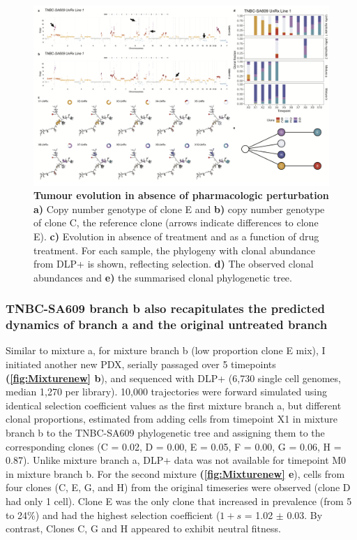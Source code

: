 \begin{figure}
\centering
\includegraphics[width=\textwidth]{Figures/chap4/genePlotsa609mix.png}
	
\caption[Tumour evolution in absence of pharmacologic perturbation]
	{\small
	\textbf{Tumour evolution in absence of pharmacologic perturbation}
	    \textbf{a)} Copy number genotype of clone E and \textbf{b)} copy number genotype of clone C, the reference clone (arrows indicate differences to clone E).  
	    \textbf{c)} Evolution in absence of treatment and as a function of drug treatment. For each sample, the phylogeny with clonal abundance from DLP+ is shown, reflecting selection. \textbf{d)} The observed clonal abundances and \textbf{e)} the summarised clonal phylogenetic tree.}
	\label{fig:genotype609mix}
\end{figure}


\subsubsection{TNBC-SA609 branch b also recapitulates the predicted dynamics of branch a and the original untreated branch}

Similar to mixture a, for mixture branch b (low proportion clone E mix), I initiated another new PDX, serially passaged over 5 timepoints \textbf{(\autoref{fig:Mixturenew} b}), and sequenced with DLP+  (6,730 single cell genomes, median 1,270 per library).
10,000 trajectories were forward simulated using identical selection coefficient values as the first mixture branch a, but different clonal proportions, estimated from adding cells from timepoint X1 in mixture branch b to the TNBC-SA609 phylogenetic tree and assigning them to the corresponding clones (C = 0.02, D = 0.00, E = 0.05, F = 0.00, G = 0.06, H = 0.87). Unlike mixture branch a, DLP+ data was not available for timepoint M0 in mixture branch b.
For the second mixture \textbf{(\autoref{fig:Mixturenew} e}), cells from four clones (C, E, G, and H) from the original timeseries were observed (clone D had only  1 cell). Clone E was the only clone that increased in prevalence (from 5 to 24\%) and had the highest selection coefficient ($1 + s$ = 1.02 $\pm$ 0.03.  By contrast, Clones C, G and H appeared to exhibit neutral fitness. 

